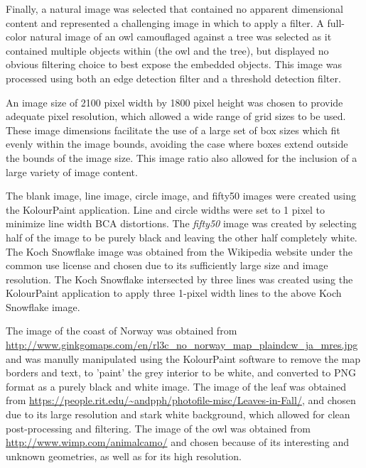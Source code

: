 \documentclass[12pt, oneside]{book}
\begin{document}
Finally, a natural image was selected that contained no apparent dimensional content and represented a challenging image in which to apply a filter.  A full-color natural image of an owl camouflaged against a tree was selected as it contained multiple objects within (the owl and the tree), but displayed no obvious filtering choice to best expose the embedded objects.  This image was processed using both an edge detection filter and a threshold detection filter.

An image size of 2100 pixel width by 1800 pixel height was chosen to provide adequate pixel resolution, which allowed a wide range of grid sizes to be used.  These image dimensions facilitate the use of a large set of box sizes which fit evenly within the image bounds, avoiding the case where boxes extend outside the bounds of the image size.  This image ratio also allowed for the inclusion of a large variety of image content.

The blank image, line image, circle image, and fifty50 images were created using the KolourPaint application.  Line and circle widths were set to 1 pixel to minimize line width BCA distortions.  The \textit{fifty50} image was created by selecting half of the image to be purely black and leaving the other half completely white.  The Koch Snowflake image was obtained from the Wikipedia website under the common use license and chosen due to its sufficiently large size and image resolution.  The Koch Snowflake intersected by three lines was created using the KolourPaint application to apply three 1-pixel width lines to the above Koch Snowflake image.

The image of the coast of Norway was obtained from \url{http://www.ginkgomaps.com/en/rl3c_no_norway_map_plaindcw_ja_mres.jpg} and was manully manipulated using the KolourPaint software to remove the map borders and text, to 'paint' the grey interior to be white, and converted to PNG format as a purely black and white image.  The image of the leaf was obtained from \url{https://people.rit.edu/~andpph/photofile-misc/Leaves-in-Fall/}, and chosen due to its large resolution and stark white background, which allowed for clean post-processing and filtering.  The image of the owl was obtained from \url{http://www.wimp.com/animalcamo/} and chosen because of its interesting and unknown geometries, as well as for its high resolution.
\end{document}
